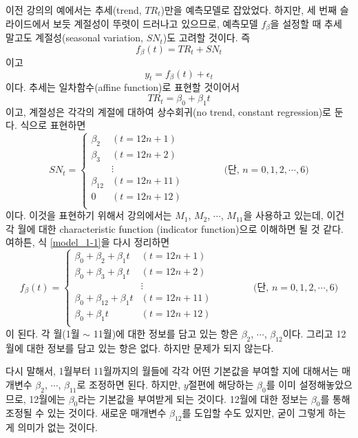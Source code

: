 \documentclass{article}
\begin{document}
이전 강의의 예에서는 추세(trend, $TR_t$)만을 예측모델로 잡았었다. 하지만, 세 번째 슬라이드에서 보듯 계절성이 뚜렷이 드러나고 있으므로, 예측모델 \(f_\beta\)을 설정할 때 추세 말고도 계절성(seasonal variation, $SN_t$)도 고려할 것이다.
즉
\begin{equation}\label{model_1-1}
f_\beta(t) = TR_t+SN_t
\end{equation}
이고
\[y_t=f_\beta(t)+\epsilon_t\]
이다.
추세는 일차함수(affine function)로 표현할 것이어서
\[TR_t = \beta_0+\beta_1 t\]
이고, 계절성은 각각의 계절에 대하여 상수회귀(no trend, constant regression)로 둔다.
식으로 표현하면
\[SN_t = \begin{cases}
\beta_2&(t=12n+1)\\
\beta_3&(t=12n+2)\\
&\vdots\\
\beta_{12}&(t=12n+11)\\
0&(t=12n+12)\\
\end{cases}\qquad\qquad(\text{단, \(n=0,1,2,\cdots,6)\)}\]
이다.
이것을 표현하기 위해서 강의에서는 \(M_1\), \(M_2\), \(\cdots\), \(M_{11}\)을 사용하고 있는데, 이건 각 월에 대한 characteristic function (indicator function)으로 이해하면 될 것 같다.
여하튼, 식 \eqref{model_1-1}을 다시 정리하면
\begin{equation}\label{model_1-2}
f_\beta(t) = \begin{cases}
\beta_0+\beta_2+\beta_1t&(t=12n+1)\\
\beta_0+\beta_3+\beta_1t&(t=12n+2)\\
&\vdots\\
\beta_0+\beta_{12}+\beta_1t&(t=12n+11)\\
\beta_0+\beta_1t&(t=12n+12)\\
\end{cases}\qquad\qquad(\text{단, \(n=0,1,2,\cdots,6)\)}
\end{equation}
이 된다.
각 월(1월 \(\sim\) 11월)에 대한 정보를 담고 있는 항은 \(\beta_2\), \(\cdots\), \(\beta_{12}\)이다.
그리고 12월에 대한 정보를 담고 있는 항은 없다.
하지만 문제가 되지 않는다.

다시 말해서, 1월부터 11월까지의 월들에 각각 어떤 기본값을 부여할 지에 대해서는 매개변수 \(\beta_2\), \(\cdots\), \(\beta_{11}\)로 조정하면 된다.
하지만, \(y\)절편에 해당하는 \(\beta_0\)를 이미 설정해놓았으므로, 12월에는 \(\beta_0\)라는 기본값을 부여받게 되는 것이다.
12월에 대한 정보는 \(\beta_0\)를 통해 조정될 수 있는 것이다.
새로운 매개변수 \(\beta_{12}\)를 도입할 수도 있지만, 굳이 그렇게 하는 게 의미가 없는 것이다.
\end{document}
